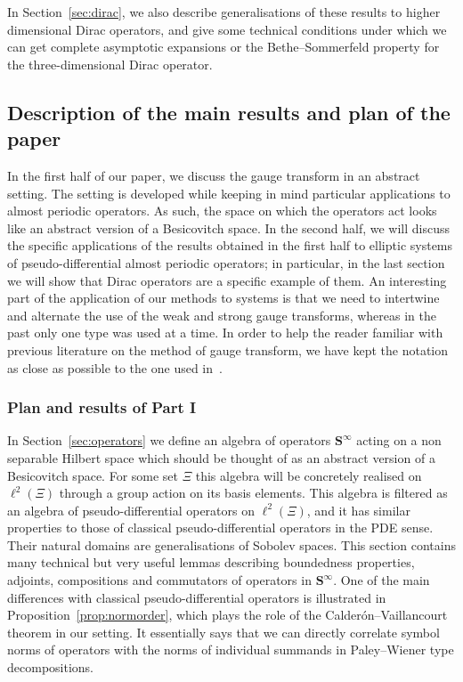 \documentclass[AHL,Unicode,longabstracts,published]{cedram}
\newcommand{\BS}{\mathbf S}
\begin{document}
In Section~\ref{sec:dirac}, we also describe generalisations of these results to higher dimensional Dirac operators, and give some technical conditions under which we can get complete asymptotic expansions or the Bethe--Sommerfeld property for the three-dimensional Dirac operator.

\subsection{Description of the main results and plan of the paper}

In the first half of our paper, we discuss the gauge transform in an abstract setting. The setting is developed while keeping in mind particular applications to almost periodic operators. As such, the space on which the operators act looks like an abstract version of a Besicovitch space. In the second half, we will discuss the specific applications of the results obtained in the first half to elliptic systems of pseudo-differential almost periodic operators; in particular, in the last section we will show that Dirac operators are a specific example of them. An interesting part of the application of our methods to systems is that we need to intertwine and alternate the use of the weak and strong gauge transforms, whereas in the past only one type was used at a time. In order to help the reader familiar with previous literature on the method of gauge transform, we have kept the notation as close as possible to the one used in~\cite{MorParSht2014,ParSob2010}.

\subsubsection*{Plan and results of Part I}
In Section~\ref{sec:operators} we define an algebra of operators $\BS^\infty$ acting on a non separable Hilbert space which should be thought of as an abstract version of a Besicovitch space. For some set $\Xi$ this algebra will be concretely realised on $\ell^2(\Xi)$ through a group action on its basis elements. This algebra is filtered as an algebra of pseudo-differential operators on $\ell^2(\Xi)$, and it has similar properties to those of classical pseudo-differential operators in the PDE sense. Their natural domains are generalisations of Sobolev spaces. This section contains many technical but very useful lemmas describing boundedness properties, adjoints, compositions and commutators of operators in $\BS^\infty$. One of the main differences with classical pseudo-differential operators is illustrated in Proposition~\ref{prop:normorder}, which plays the role of the Calder\'on--Vaillancourt theorem in our setting. It essentially says that we can directly correlate symbol norms of operators with the norms of individual summands in Paley--Wiener type decompositions.
\end{document}

